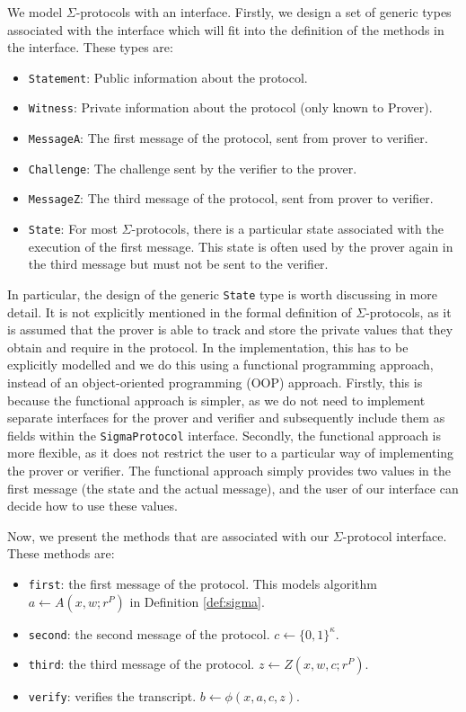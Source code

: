 We model $\Sigma$-protocols with an interface.
Firstly, we design a set of generic types associated with the interface which will fit into 
the definition of the methods in the interface. These types are:
\begin{itemize}
  \item \texttt{Statement}: Public information about the protocol.
  \item \texttt{Witness}: Private information about the protocol (only known to Prover).
  \item \texttt{MessageA}: The first message of the protocol, sent from prover to verifier.
  \item \texttt{Challenge}: The challenge sent by the verifier to the prover.
  \item \texttt{MessageZ}: The third message of the protocol, sent from prover to verifier. 
  \item \texttt{State}: For most $\Sigma$-protocols, there is a particular state associated 
  with the execution of the first message. This state is often used by the prover again in 
  the third message but must not be sent to the verifier.
\end{itemize}

In particular, the design of the generic \texttt{State} type is worth discussing in more detail.
It is not explicitly mentioned in the formal definition of $\Sigma$-protocols, as it is 
assumed that the prover is able to track and store the private values that they obtain and 
require in the protocol. In the implementation, this has to be explicitly modelled and 
we do this using a functional programming approach, instead of an object-oriented
programming (OOP) approach. 
Firstly, this is because the functional approach is simpler, as we do not need to 
implement separate interfaces for the prover and verifier and subsequently include them as fields
within the \texttt{SigmaProtocol} interface. Secondly, the functional approach is more flexible,
as it does not restrict the user to a particular way of implementing the prover or verifier.
The functional approach simply provides two values in the first message (the state and the 
actual message), and the user of our interface can decide how to use these values.

Now, we present the methods that are associated with our $\Sigma$-protocol interface. 
These methods are: 
\begin{itemize}
  \item \texttt{first}: the first message of the protocol. This models algorithm 
  $a \leftarrow A(x, w; r^P)$ 
  in Definition \ref{def:sigma}.
  \item \texttt{second}: the second message of the protocol. $c \leftarrow \{0,1\}^\kappa$.
  \item \texttt{third}: the third message of the protocol. $z \leftarrow Z(x, w, c; r^P)$. 
  \item \texttt{verify}: verifies the transcript. $b \leftarrow \phi(x, a, c, z)$.
\end{itemize}

